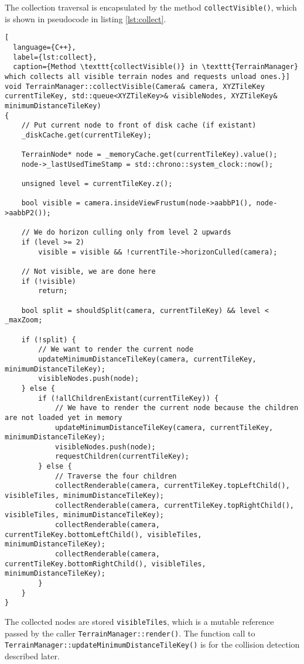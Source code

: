 The collection traversal is encapsulated by the method \texttt{collectVisible()},
which is shown in pseudocode in listing \ref{lst:collect}.

\begin{lstlisting}[
  language={C++},
  label={lst:collect},
  caption={Method \texttt{collectVisible()} in \texttt{TerrainManager} which collects all visible terrain nodes and requests unload ones.}]
void TerrainManager::collectVisible(Camera& camera, XYZTileKey currentTileKey, std::queue<XYZTileKey>& visibleNodes, XYZTileKey& minimumDistanceTileKey)
{
    // Put current node to front of disk cache (if existant)
    _diskCache.get(currentTileKey);

    TerrainNode* node = _memoryCache.get(currentTileKey).value();
    node->_lastUsedTimeStamp = std::chrono::system_clock::now();

    unsigned level = currentTileKey.z();

    bool visible = camera.insideViewFrustum(node->aabbP1(), node->aabbP2());

    // We do horizon culling only from level 2 upwards
    if (level >= 2)
        visible = visible && !currentTile->horizonCulled(camera);

    // Not visible, we are done here
    if (!visible)
        return;

    bool split = shouldSplit(camera, currentTileKey) && level < _maxZoom;

    if (!split) {
        // We want to render the current node
        updateMinimumDistanceTileKey(camera, currentTileKey, minimumDistanceTileKey);
        visibleNodes.push(node);
    } else {
        if (!allChildrenExistant(currentTileKey)) {
            // We have to render the current node because the children are not loaded yet in memory
            updateMinimumDistanceTileKey(camera, currentTileKey, minimumDistanceTileKey);
            visibleNodes.push(node);
            requestChildren(currentTileKey);
        } else {
            // Traverse the four children
            collectRenderable(camera, currentTileKey.topLeftChild(), visibleTiles, minimumDistanceTileKey);
            collectRenderable(camera, currentTileKey.topRightChild(), visibleTiles, minimumDistanceTileKey);
            collectRenderable(camera, currentTileKey.bottomLeftChild(), visibleTiles, minimumDistanceTileKey);
            collectRenderable(camera, currentTileKey.bottomRightChild(), visibleTiles, minimumDistanceTileKey);
        }
    }
}
\end{lstlisting}
The collected nodes are stored \texttt{visibleTiles},
which is a mutable reference passed by the caller \texttt{TerrainManager::render()}.
The function call to \texttt{TerrainManager::updateMinimumDistanceTileKey()} is for the collision detection 
described later. 

